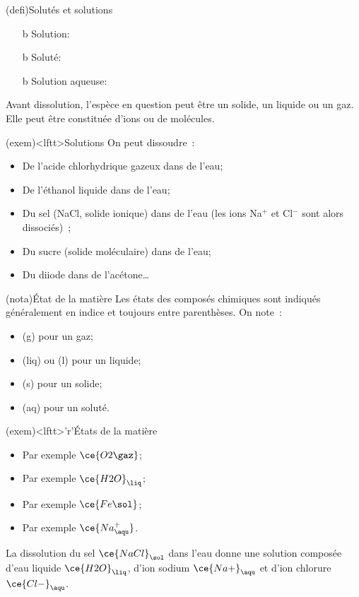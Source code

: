 \documentclass[../../main/main.tex]{subfiles}
\begin{document}
\begin{tcb}[label=def:solu](defi){Solutés et solutions}
	\begin{itemize}
		\item[b]{Solution}: %
		\item[b]{Soluté}: %
		\item[b]{Solution aqueuse}: %
	\end{itemize}
	Avant dissolution, l'espèce en question peut être un solide, un liquide
	ou un gaz. Elle peut être constituée d'ions ou de molécules.
\end{tcb}

\begin{tcb}[label=exem:solution](exem)<lftt>{Solutions}
	On peut dissoudre~:
	\begin{itemize}
		\item De l'acide chlorhydrique gazeux dans de l'eau;
		\item De l'éthanol liquide dans de l'eau;
		\item Du sel (NaCl, solide ionique) dans de l'eau (les ions Na$^+$ et
		      Cl$^-$ sont alors dissociés)~;
		\item Du sucre (solide moléculaire) dans de l'eau;
		\item Du diiode dans de l'acétone…
	\end{itemize}
\end{tcb}

\begin{tcbraster}[raster columns=2, raster equal height=rows]
	\begin{tcb}[label=nota:état](nota){État de la matière}
		Les états des composés chimiques sont indiqués généralement en indice et
		toujours entre parenthèses. On note~:
		\begin{itemize}
			\item{} (g) pour un gaz;
			\item{} (liq) ou (l) pour un liquide;
			\item{} (s) pour un solide;
			\item{} (aq) pour un soluté.
		\end{itemize}
	\end{tcb}
	\begin{tcb}[label=exem:notationétat](exem)<lftt>'r'{États de la matière}
		\begin{itemize}
			\item Par exemple $\ce{O2\gaz}$;
			\item Par exemple $\ce{H2O}_{\liq}$;
			\item Par exemple $\ce{Fe\sol}$;
			\item Par exemple $\ce{Na_{\aqu}^+}$.
		\end{itemize}
		La dissolution du sel $\ce{NaCl}_{\sol}$ dans l'eau donne une solution
		composée d'eau liquide $\ce{H2O}_{\liq}$, d'ion sodium $\ce{Na+}_{\aqu}$ et
		d'ion chlorure $\ce{Cl-}_{\aqu}$.
	\end{tcb}
\end{tcbraster}
\end{document}
